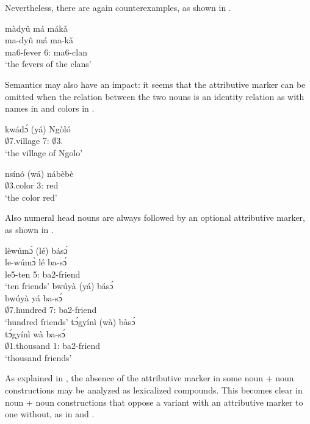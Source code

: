 \noindent Nevertheless, there are again counterexamples, as shown in .

\ea\label{fever}
  \glll   màdyû má mákǎ \\
  ma-dyû má ma-kǎ \\
               ma6-fever 6:{\ATT} ma6-clan \\
    \trans `the fevers of the clans'
\z

Semantics may also have an impact: it seems that the attributive marker can be omitted when the relation between the two nouns is an identity relation as with names in  and colors in .

\ea\label{name}
  \gll     kwádɔ́ (yá) Ngòló \\
               $\emptyset$7.village 7:{\ATT} $\emptyset$3.{\PN} \\
    \trans `the village of Ngolo'
\z

\ea\label{color}
  \gll     nsínó (wá) nábèbè \\
               $\emptyset$3.color 3:{\ATT} red \\
    \trans `the color red'
\z

\noindent Also numeral head nouns are always followed by an optional attributive marker, as shown in .

\ea\label{num}
\ea \label{num1}
  \glll    lèwúmɔ̀ (lé) básɔ́ \\     le-wúmɔ̀ lé ba-sɔ́ \\
               le5-ten 5:{\ATT} ba2-friend  \\
    \trans `ten friends'
\ex\label{num2}
 \glll     bwúyà (yá) básɔ́ \\
 bwúyà yá ba-sɔ́ \\
              $\emptyset$7.hundred 7:{\ATT} ba2-friend \\
    \trans `hundred friends'
\ex\label{num3}
 \glll  tɔ́gyínì (wà) bàsɔ́ \\
 tɔ́gyínì wà ba-sɔ́ \\
              $\emptyset$1.thousand 1:{\ATT} ba2-friend  \\
    \trans `thousand friends'
\z
\z

As explained in , the absence of the attributive marker in some noun + noun constructions may be analyzed as  lexicalized compounds. This becomes clear in noun + noun constructions that oppose a variant with an attributive marker to one without, as in   and . 

